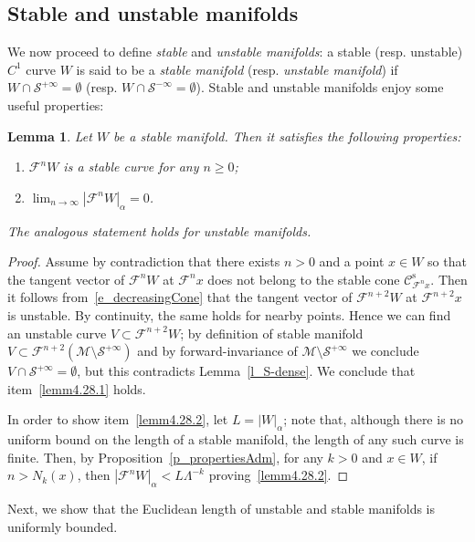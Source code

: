 \documentclass[10pt]{amsart}
\newtheorem{lemm}[theo]{Lemma}\newtheorem{prop}[theo]{Proposition}\newtheorem{coro}[theo]{Corollary}\newtheorem{conj}[theo]{Conjecture}
\theoremstyle{definition}\newtheorem{defi}[theo]{Definition}\newtheorem{rema}[theo]{Remark}\newtheorem{exam}[theo]{Example}\newtheorem{exem}[theo]{Example}\newtheorem{nota}[theo]{Notation}
\newcommand{\stable}{\text{s}}
\newcommand{\cm}{\mathcal{F}}
\newcommand{\csp}{\mathcal{M}}
\newcommand{\cone}{\mathcal{C}}
\newcommand{\cones}{\cone^\stable}
\newcommand{\singPrivate}{\mathcal{S}}
\newcommand{\sing}[1]{\singPrivate^{#1}}
\newcommand{\adm}{_{\alpha^{+}}}
\newcommand*\DS{\displaystyle}
\renewcommand{\adm}{_{\alpha}}
\newcommand*{\relabel}{\renewcommand{\labelenumi}{(\theenumi)}}
\newcommand*{\alphenumi}{\renewcommand*{\theenumi}{\alph{enumi}}\relabel}
\begin{document}
\subsection{Stable and unstable manifolds}\label{sec:stable-unst-mflds}
We now proceed to define \emph{stable} and \emph{unstable manifolds}: a stable (resp. unstable) $C^{1}$ curve $W$ is said to be a
\emph{stable manifold} (resp. \emph{unstable manifold}) if $W\cap\sing{+\infty} = \emptyset$ (resp. $W\cap\sing{-\infty} = \emptyset$). Stable and unstable manifolds enjoy some useful properties:
\begin{lemm}\label{lem:properties_stable_mfolds}
Let $W$ be a stable manifold. Then it satisfies the following properties:
\begin{enumerate}\alphenumi
\item\label{lemm4.28.1} $\cm^{n}W$ is a stable curve for any $n\ge 0$;
\item\label{lemm4.28.2} $\DS \lim_{n\to\infty}|\cm^{n}W|\adm = 0$.
\end{enumerate}
The analogous statement holds for unstable manifolds.
\end{lemm}
\begin{proof}
Assume by contradiction that there exists $n > 0$ and a point $x\in W$ so that the tangent vector of $\cm^{n}W$ at $\cm^{n}x$ does not belong to the stable cone $\cones_{\cm^{n}x}$. Then it follows from~\eqref{e_decreasingCone} that the tangent vector of $\cm^{n+2}W$ at $\cm^{n+2}x$ is unstable. By continuity, the same holds for nearby points. Hence we can find an unstable curve $V\subset\cm^{n+2}W$; by definition of stable manifold $V\subset\cm^{n+2}(\csp\setminus\sing{+\infty})$ and by forward-invariance of $\csp\setminus\sing{+\infty}$ we conclude $V\cap\sing{+\infty} = \emptyset$, but this contradicts Lemma~\ref{l_S-dense}. We conclude that item~\eqref{lemm4.28.1} holds.

In order to show item~\eqref{lemm4.28.2}, let $L = |W|\adm$; note that, although there is no uniform bound on the length of a stable manifold, the length of any such curve is finite. Then, by Proposition~\ref{p_propertiesAdm}, for any $k > 0$ and $x\in W$, if $n > N_{k}(x)$, then $|\cm^{n}W|\adm < L\Lambda^{-k}$ proving~\eqref{lemm4.28.2}.
\end{proof}


Next, we show that the Euclidean length of unstable and stable manifolds is uniformly bounded.
\end{document}
